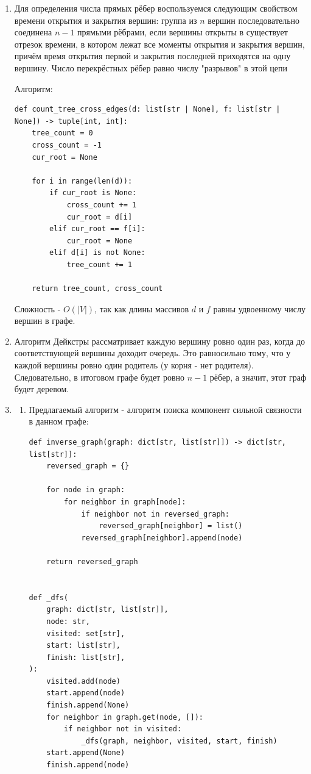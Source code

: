 \documentclass{article}
\begin{document}
\begin{enumerate}
	\item Для определения числа прямых рёбер воспользуемся
	      следующим свойством времени открытия и закрытия вершин:
	      группа из $n$ вершин последовательно соединена $n-1$ прямыми
	      рёбрами, если вершины открыты в существует отрезок времени,
	      в котором лежат все моменты открытия и закрытия вершин, причём
	      время открытия первой и закрытия последней приходятся на одну
	      вершину. Число перекрёстных рёбер равно числу "разрывов" в
	      этой цепи

	      Алгоритм:
	      \begin{lstlisting}
def count_tree_cross_edges(d: list[str | None], f: list[str | None]) -> tuple[int, int]:
	tree_count = 0
	cross_count = -1
	cur_root = None

	for i in range(len(d)):
		if cur_root is None:
			cross_count += 1
			cur_root = d[i]
		elif cur_root == f[i]:
			cur_root = None
		elif d[i] is not None:
			tree_count += 1

	return tree_count, cross_count
		  \end{lstlisting}

	      Сложность - $O(\left| V \right|)$, так как длины массивов
	      $d$ и $f$ равны удвоенному числу вершин в графе.

	\item Алгоритм Дейкстры рассматривает каждую вершину ровно
	      один раз, когда до соответствующей вершины доходит
	      очередь. Это равносильно тому, что у каждой вершины ровно
	      один родитель (у корня - нет родителя). Следовательно,
	      в итоговом графе будет ровно $n-1$ рёбер, а значит,
	      этот граф будет деревом.

	\item \begin{enumerate}
		      \item
		            Предлагаемый алгоритм - алгоритм поиска компонент
		            сильной связности в данном графе:
		            \begin{lstlisting}
def inverse_graph(graph: dict[str, list[str]]) -> dict[str, list[str]]:
	reversed_graph = {}

	for node in graph:
		for neighbor in graph[node]:
			if neighbor not in reversed_graph:
				reversed_graph[neighbor] = list()
			reversed_graph[neighbor].append(node)

	return reversed_graph


def _dfs(
	graph: dict[str, list[str]],
	node: str,
	visited: set[str],
	start: list[str],
	finish: list[str],
):
	visited.add(node)
	start.append(node)
	finish.append(None)
	for neighbor in graph.get(node, []):
		if neighbor not in visited:
			_dfs(graph, neighbor, visited, start, finish)
	start.append(None)
	finish.append(node)



\end{lstlisting}
\end{enumerate}
\end{enumerate}
\end{document}
